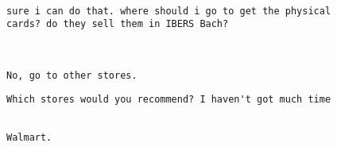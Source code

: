 \documentclass[xcolor=table]{beamer}
\begin{document}
\begin{frame}[fragile]
\begin{small}
\begin{verbatim}

sure i can do that. where should i go to get the physical
cards? do they sell them in IBERS Bach?

	\end{verbatim}
\end{small}
\end{frame}

 
\begin{frame}[fragile]
\begin{small}
	\begin{verbatim}
No, go to other stores. 

	\end{verbatim}
\end{small}
\end{frame}

\begin{frame}[fragile]
\begin{small}
	\begin{verbatim}
Which stores would you recommend? I haven't got much time

	\end{verbatim}
\end{small}
\end{frame}

\begin{frame}[fragile]
\begin{small}
	\begin{verbatim}
 
Walmart.
	\end{verbatim}
\end{small}
\end{frame}
\end{document}
